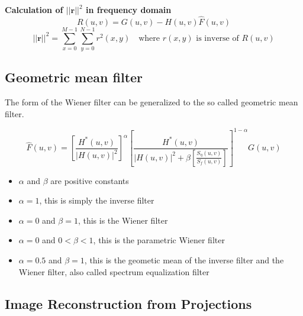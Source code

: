 \textbf{Calculation of $||\mathbf{r}||^2$ in frequency domain}
	\begin{equation}
		R(u,v) = G(u,v) - H(u,v)\hat{F}(u,v)
	\end{equation}
	\begin{equation}
		||\mathbf{r}||^2 = \sum\limits_{x=0}^{M-1} \sum\limits_{y=0}^{N-1} r^{2}(x,y) \quad \textrm{where } r(x,y) \textrm{ is inverse of } R(u,v) 
		\label{eq:rCalculateFreq}
	\end{equation}

\subsection{Geometric mean filter }
The form of the Wiener filter can be generalized to the so called geometric mean filter.

\begin{equation}
	\hat{F}(u,v) =  \left[ \frac{H^*(u,v)}{|H(u,v)|^2} \right]^{\alpha}  \left[ \frac{H^*(u,v)}{|H(u,v)|^2 + \beta \left[ \frac{S_\eta(u,v)}{S_f(u,v)}\right]} \right]^{1-\alpha} G(u,v)
\end{equation}

\begin{itemize}
	\item $\alpha$ and $\beta$ are positive constants
	\item $\alpha = 1$, this is simply the inverse filter
	\item $\alpha=0$ and $\beta=1$, this is the Wiener filter
	\item $\alpha=0$ and $0 < \beta < 1$, this is the parametric Wiener filter
	\item $\alpha=0.5$ and $\beta=1$, this is the geometic mean of the inverse filter and the Wiener filter, also called spectrum equalization filter
\end{itemize}

\subsection{Image Reconstruction from Projections }